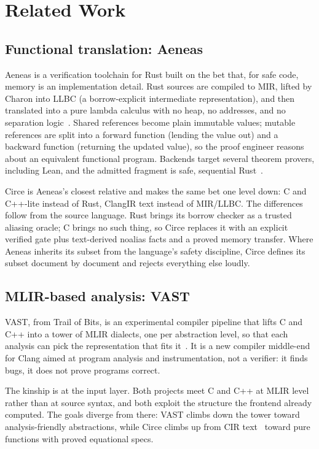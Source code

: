 \chapter{Related Work}
\label{ch:related}

\section{Functional translation: Aeneas}

Aeneas is a verification toolchain for Rust built on the bet that, for
safe code, memory is an implementation detail. Rust sources are compiled
to MIR, lifted by Charon into LLBC (a borrow-explicit intermediate
representation), and then translated into a pure lambda calculus with no
heap, no addresses, and no separation logic~\cite{aeneas-charon}. Shared
references become plain immutable values; mutable references are split
into a forward function (lending the value out) and a backward function
(returning the updated value), so the proof engineer reasons about an
equivalent functional program. Backends target several theorem provers,
including Lean, and the admitted fragment is safe, sequential
Rust~\cite{aeneas-site}.

Circe is Aeneas's closest relative and makes the same bet one level
down: C and C++-lite instead of Rust, ClangIR text instead of MIR/LLBC.
The differences follow from the source language. Rust brings its borrow
checker as a trusted aliasing oracle; C brings no such thing, so Circe
replaces it with an explicit verified gate plus text-derived noalias
facts and a proved memory transfer. Where Aeneas inherits its subset
from the language's safety discipline, Circe defines its subset
document by document and rejects everything else loudly.

\section{MLIR-based analysis: VAST}

VAST, from Trail of Bits, is an experimental compiler pipeline that
lifts C and C++ into a tower of MLIR dialects, one per abstraction
level, so that each analysis can pick the representation that fits
it~\cite{vast-blog}. It is a new compiler middle-end for Clang aimed at
program analysis and instrumentation, not a verifier: it finds bugs, it
does not prove programs correct.

The kinship is at the input layer. Both projects meet C and C++ at MLIR
level rather than at source syntax, and both exploit the structure the
frontend already computed. The goals diverge from there: VAST climbs
down the tower toward analysis-friendly abstractions, while Circe climbs
up from CIR text~\cite{clangir} toward pure functions with proved
equational specs.

